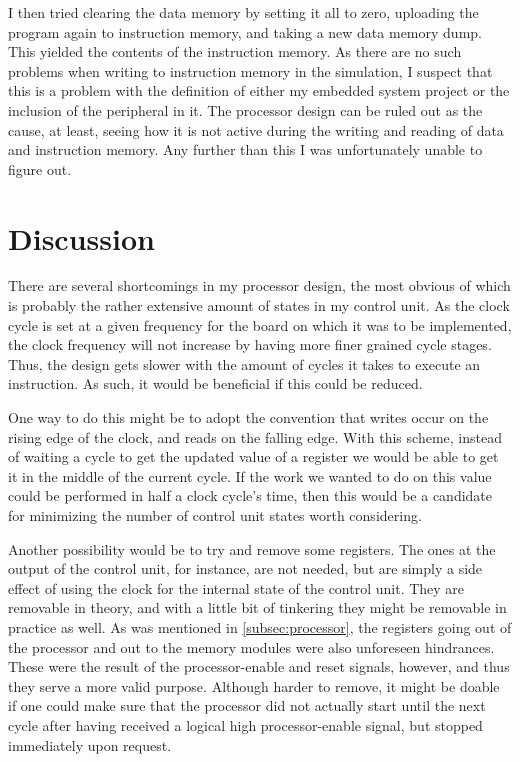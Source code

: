\documentclass[11pt]{article}
\begin{document}
I then tried clearing the data memory by setting it all to zero,
uploading the program again to instruction memory, and taking a new
data memory dump. This yielded the contents of the instruction
memory. As there are no such problems when writing to instruction
memory in the simulation, I suspect that this is a problem with the
definition of either my embedded system project or the inclusion of
the peripheral in it. The processor design can be ruled out as the
cause, at least, seeing how it is not active during the writing and
reading of data and instruction memory. Any further than this I was
unfortunately unable to figure out.

\section{Discussion}
\label{sec:discussion}
There are several shortcomings in my processor design, the most
obvious of which is probably the rather extensive amount of states in
my control unit. As the clock cycle is set at a given frequency for
the board on which it was to be implemented, the clock frequency will
not increase by having more finer grained cycle stages. Thus, the
design gets slower with the amount of cycles it takes to execute an
instruction. As such, it would be beneficial if this could be reduced. 

One way to do this might be to adopt the convention that writes occur
on the rising edge of the clock, and reads on the falling edge. With
this scheme, instead of waiting a cycle to get the updated value of a
register we would be able to get it in the middle of the current
cycle. If the work we wanted to do on this value could be performed in
half a clock cycle's time, then this would be a candidate for
minimizing the number of control unit states worth considering.

Another possibility would be to try and remove some registers. The
ones at the output of the control unit, for instance, are not needed,
but are simply a side effect of using the clock for the internal state
of the control unit. They are removable in theory, and with a little
bit of tinkering they might be removable in practice as well. As was
mentioned in \autoref{subsec:processor}, the registers going out of
the processor and out to the memory modules were also unforeseen
hindrances. These were the result of the processor-enable and reset
signals, however, and thus they serve a more valid purpose. Although
harder to remove, it might be doable if one could make sure that the
processor did not actually start until the next cycle after having
received a logical high processor-enable signal, but stopped
immediately upon request.
\end{document}

